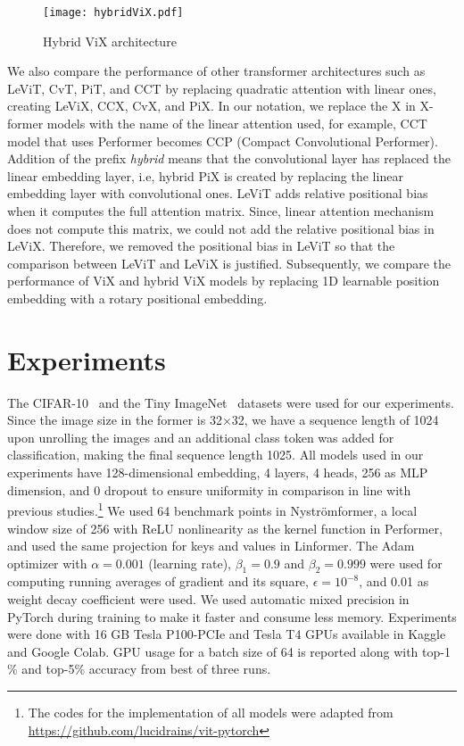 \documentclass{article}
\begin{document}
\begin{figure}[h]
\centering
\texttt{[image: hybridViX.pdf]}
\caption{Hybrid ViX architecture }
\label{fig:x HybridViX}
\end{figure}

We also compare the performance of other transformer architectures such as LeViT, CvT, PiT, and CCT by replacing quadratic attention with linear ones, creating LeViX, CCX, CvX, and PiX. In our notation, we replace the X in X-former models with the name of the linear attention used, for example, CCT model that uses Performer becomes CCP (Compact Convolutional Performer). Addition of the prefix \emph{hybrid} means that the convolutional layer has replaced the linear embedding layer, i.e, hybrid PiX is created by replacing the linear embedding layer with convolutional ones. LeViT adds relative positional bias when it computes the full attention matrix. Since, linear attention mechanism does not compute this matrix, we could not add the relative positional bias in LeViX.  Therefore, we removed the positional bias in LeViT so that the comparison between LeViT and LeViX is justified. Subsequently, we compare the performance of ViX and hybrid ViX models by replacing 1D learnable position embedding with a rotary positional embedding.


\section{Experiments}

The CIFAR-10~\cite{Krizhevsky09learningmultiple} and the Tiny ImageNet~\cite{Le2015TinyIV} datasets were used for our experiments. Since the image size in the former is 32×32, we have a sequence length of 1024 upon unrolling the images and an additional class token was added for classification, making the final sequence length 1025. All models used in our experiments have 128-dimensional embedding, 4 layers, 4 heads, 256 as MLP dimension, and 0 dropout to ensure uniformity in comparison in line with previous studies.\footnote{The codes for the implementation of all models were adapted from \href{https://github.com/lucidrains/vit-pytorch}{https://github.com/lucidrains/vit-pytorch}} We used 64 benchmark points in Nyströmformer, a local window size of 256 with ReLU nonlinearity as the kernel function in Performer, and used the same projection for keys and values in Linformer. The Adam optimizer with $\alpha = 0.001$ (learning rate), $\beta_{1} = 0.9$ and $\beta_{2}=0.999$ were used for computing running averages of gradient and its square, $\epsilon = 10^{-8}$, and 0.01 as weight decay coefficient were used. We used automatic mixed precision in PyTorch during training to make it faster and consume less memory. Experiments were done with 16 GB Tesla P100-PCIe and Tesla T4 GPUs available in Kaggle and Google Colab. GPU usage for a batch size of 64 is reported along with top-1 \% and top-5\% accuracy from best of three runs.
\end{document}
